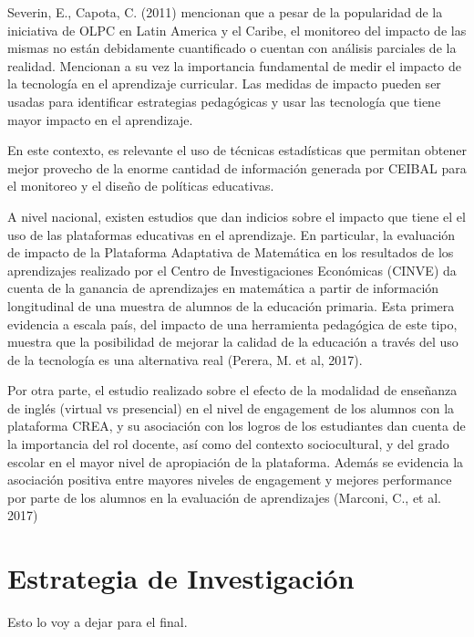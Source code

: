 \documentclass[msc,oneside,a4paper]{udelar}\usepackage[]{graphicx}\usepackage[]{color}
\begin{document}
Severin, E., Capota, C. (2011) mencionan que a pesar de la popularidad de la iniciativa de OLPC en Latin America y el Caribe, el monitoreo del impacto de las mismas no están debidamente cuantificado o cuentan con análisis parciales de la realidad. Mencionan a su vez la importancia fundamental de medir el impacto de la tecnología en el aprendizaje curricular. Las medidas de impacto pueden ser usadas para identificar estrategias pedagógicas y usar las tecnología que tiene mayor impacto en el aprendizaje.

En este contexto, es relevante el uso de técnicas estadísticas que permitan obtener mejor provecho de la enorme cantidad de información generada por CEIBAL para el monitoreo y el diseño de políticas educativas.

A nivel nacional, existen estudios que dan indicios sobre el impacto que tiene el
el uso de las plataformas educativas en el aprendizaje. En particular, la evaluación de impacto de la Plataforma Adaptativa de Matemática en los resultados de los aprendizajes realizado por el Centro de Investigaciones Económicas (CINVE) da cuenta de la ganancia de aprendizajes en matemática a partir de información longitudinal de una muestra de alumnos de la educación primaria. Esta primera evidencia a escala país, del impacto de una herramienta pedagógica de este tipo, muestra que la posibilidad de mejorar la calidad de la educación a través del uso de la tecnología es una alternativa real (Perera, M. et al, 2017).

Por otra parte, el estudio realizado sobre el efecto de la modalidad de enseñanza de inglés (virtual vs presencial) en el nivel de engagement de los alumnos con la plataforma CREA, y su asociación con los logros de los estudiantes dan cuenta de la importancia del rol docente, así como del contexto sociocultural, y del grado escolar en el mayor nivel de apropiación de la plataforma. Además se evidencia la asociación positiva entre mayores niveles de engagement y mejores performance por parte de los alumnos en la evaluación de aprendizajes (Marconi, C., et al. 2017)



\chapter{Estrategia de Investigación}

Esto lo voy a dejar para el final.



\end{document}
